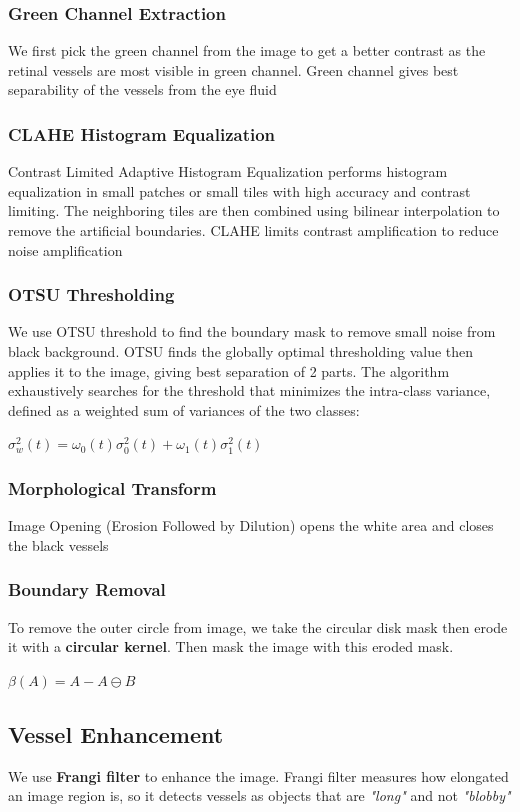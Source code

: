 \documentclass{article}
\begin{document}
\subsubsection{Green Channel Extraction}
We first pick the green channel from the image to get a better contrast as the retinal vessels are most visible in green channel. Green channel gives best separability of the vessels from the eye fluid

\subsubsection{CLAHE Histogram Equalization}
Contrast Limited Adaptive Histogram Equalization performs histogram equalization in small patches or small tiles with high accuracy and contrast limiting. The neighboring tiles are then combined using bilinear interpolation to remove the artificial boundaries. CLAHE limits contrast amplification to reduce noise amplification

\subsubsection{OTSU Thresholding}
We use OTSU threshold to find the boundary mask to remove small noise from black background. OTSU finds the globally optimal thresholding value then applies it to the image, giving best separation of 2 parts.
The algorithm exhaustively searches for the threshold that minimizes the intra-class variance, defined as a weighted sum of variances of the two classes:

$\sigma _{w}^{2}(t)=\omega _{0}(t)\sigma _{0}^{2}(t)+\omega _{1}(t)\sigma _{1}^{2}(t)$
\subsubsection{Morphological Transform}
Image Opening (Erosion Followed by Dilution) opens the white area and closes the black vessels
\subsubsection{Boundary Removal}
To remove the outer circle from image, we take the circular disk mask then erode it with a \textbf{circular kernel}. Then mask the image with this eroded mask.

$\beta(A) = A - A \ominus B$

\clearpage

\subsection{Vessel Enhancement}
We use \textbf{Frangi filter} to enhance the image.
Frangi filter measures how elongated an image region is, so it detects vessels as objects that are \textit{"long"} and not \textit{"blobby"}
\end{document}
